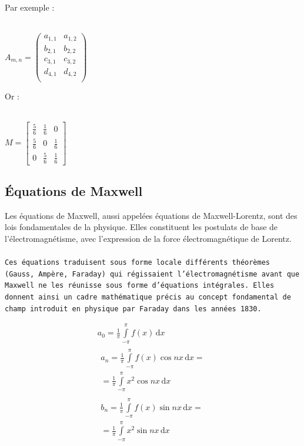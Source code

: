 \documentclass{article}
\begin{document}
Par exemple :
\ \\ \ \\

\begin{center}

$
A_{m,n} = 
\begin{pmatrix}
a_{1,1} & a_{1,2} \\
b_{2,1} & b_{2,2} \\
c_{3,1} & c_{3,2} \\
d_{4,1} & d_{4,2} \\

\end{pmatrix} 
$
\end{center}

Or :
\ \\ \ \\

\begin{center}
$
M = \begin{bmatrix}
       \frac{5}{6} & \frac{1}{6} & 0           \\[0.3em]
       \frac{5}{6} & 0           & \frac{1}{6} \\[0.3em]
       0           & \frac{5}{6} & \frac{1}{6}
     \end{bmatrix}
$
\end{center}

\newpage

\subsection{Équations de Maxwell}

Les équations de Maxwell, aussi appelées équations de Maxwell-Lorentz, sont des lois fondamentales de la physique. Elles constituent les postulats de base de l'électromagnétisme, avec l'expression de la force électromagnétique de Lorentz.
\ \\ \ \\
\texttt{Ces équations traduisent sous forme locale différents théorèmes (Gauss, Ampère, Faraday) qui régissaient l'électromagnétisme avant que Maxwell ne les réunisse sous forme d'équations intégrales. Elles donnent ainsi un cadre mathématique précis au concept fondamental de champ introduit en physique par Faraday dans les années 1830.}

\begin{gather*}
a_0=\frac{1}{\pi}\int\limits_{-\pi}^{\pi}f(x)\,\mathrm{d}x\\[6pt]
\begin{split}
a_n=\frac{1}{\pi}\int\limits_{-\pi}^{\pi}f(x)\cos nx\,\mathrm{d}x=\\
=\frac{1}{\pi}\int\limits_{-\pi}^{\pi}x^2\cos nx\,\mathrm{d}x
\end{split}\\[6pt]
\begin{split}
b_n=\frac{1}{\pi}\int\limits_{-\pi}^{\pi}f(x)\sin nx\,\mathrm{d}x=\\
=\frac{1}{\pi}\int\limits_{-\pi}^{\pi}x^2\sin nx\,\mathrm{d}x
\end{split}\\[6pt]
\end{gather*}
\end{document}
